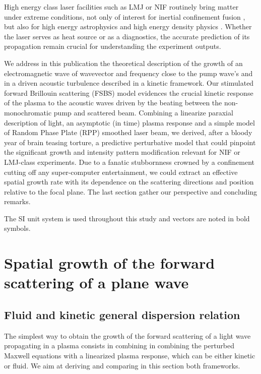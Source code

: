 \documentclass[
 reprint,
 amsmath,amssymb,
 aps,
]{revtex4-1}
\begin{document}
High energy class laser facilities such as LMJ or  NIF \cite[]{}  routinely bring matter under extreme conditions, not only of interest for inertial confinement fusion \cite{Lindl_2004,He_2007,Cavailler_2005}, but also for high energy astrophysics \cite{Drake_2012} and high energy density physics   \cite{Drake2006}. 
Whether  the laser   serves as heat source or as a diagnostics, the accurate prediction of its propagation remain crucial for understanding  the experiment outputs. 



We address in this publication the theoretical description of  the growth of an electromagnetic wave of wavevector and frequency close to the pump wave's and in a driven acoustic turbulence described in a kinetic framework. 
Our stimulated forward Brillouin scattering (FSBS) model    evidences the crucial kinetic response of the plasma to the acoustic waves driven by the beating between the non-monochromatic pump and scattered beam. 
Combining a linearize paraxial description of light, an asymptotic (in time) plasma  response and a simple model of Random Phase Plate (RPP) smoothed laser beam, we derived, after a bloody year of brain teasing torture, a predictive perturbative model that could pinpoint the significant growth and intensity pattern modification relevant for NIF or LMJ-class experiments. 
Due to a fanatic stubbornness crowned by a confinement cutting off any super-computer entertainment, we could extract an effective spatial growth rate with its dependence on the scattering directions and position relative to the focal plane. 
The last section gather our perspective and concluding remarks. 

The SI unit system is used throughout this study and vectors are noted in bold symbols. 

\section{Spatial growth of the  forward scattering of a plane wave}\label{sec:plane}
\subsection{Fluid and kinetic general dispersion relation}
The simplest way to obtain the growth of the forward scattering of a light wave propagating in a plasma consists in combining in combining the perturbed Maxwell equations with a linearized plasma response, which can be either kinetic or fluid.
We aim at deriving and comparing in this section both frameworks.
\end{document}

